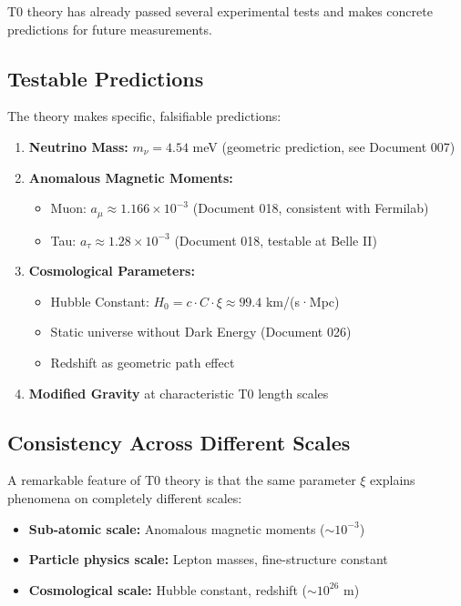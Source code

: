 \documentclass[12pt,a4paper]{article}
\begin{document}
	T0 theory has already passed several experimental tests and makes concrete predictions for future measurements.
	
	\subsection{Testable Predictions}
	
	\begin{keyresult}
		The theory makes specific, falsifiable predictions:
		\begin{enumerate}
			\item \textbf{Neutrino Mass:} $m_\nu = 4.54$ meV (geometric prediction, see Document 007)
			
			\item \textbf{Anomalous Magnetic Moments:}
			\begin{itemize}
				\item Muon: $a_\mu \approx 1.166 \times 10^{-3}$ (Document 018, consistent with Fermilab)
				\item Tau: $a_\tau \approx 1.28 \times 10^{-3}$ (Document 018, testable at Belle II)
			\end{itemize}
			
			\item \textbf{Cosmological Parameters:}
			\begin{itemize}
				\item Hubble Constant: $H_0 = c \cdot C \cdot \xi \approx 99.4$ km/(s·Mpc)
				\item Static universe without Dark Energy (Document 026)
				\item Redshift as geometric path effect
			\end{itemize}
			
			\item \textbf{Modified Gravity} at characteristic T0 length scales
		\end{enumerate}
	\end{keyresult}
	
	\subsection{Consistency Across Different Scales}
	
	A remarkable feature of T0 theory is that the same parameter $\xi$ explains phenomena on completely different scales:
	
	\begin{itemize}
		\item \textbf{Sub-atomic scale:} Anomalous magnetic moments ($\sim 10^{-3}$)
		\item \textbf{Particle physics scale:} Lepton masses, fine-structure constant
		\item \textbf{Cosmological scale:} Hubble constant, redshift ($\sim 10^{26}$ m)
	\end{itemize}
	
\end{document}
